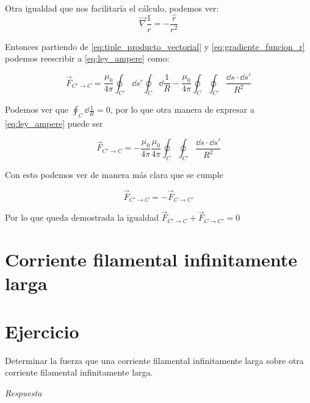 \documentclass[11pt]{report}
\theoremstyle{plain}
\theoremstyle{definition}
\begin{document}
Otra igualdad que nos facilitaría el cálculo, podemos ver:
\begin{equation}
	\vec{\nabla}\frac{1}{r}=-\frac{\hat{r}}{r^2}
	\label{eq:gradiente_funcion_r}
\end{equation}

Entonces partiendo de \ref{eq:tiple_producto_vectorial} y \ref{eq:gradiente_funcion_r} podemos reescribir a \ref{eq:ley_ampere} como:

\begin{equation*}
	\vec{F}_{C' \rightarrow C} = \frac{\mu_0}{4\pi} \oint_{C'} \dd{s'} \oint_C \dd{\frac{1}{R}} - \frac{\mu_0}{4\pi}\oint_C \oint_{C'} \frac{\dd{s} \cdot \dd{s'}}{R^2}
\end{equation*}

Podemos ver que $\oint_C \dd{\frac{1}{R}} = 0$, por lo que otra manera de expresar a \ref{eq:ley_ampere} puede ser 


\begin{equation} %
	\vec{F}_{C' \rightarrow C} = - \frac{\mu_0}{4\pi} \frac{\mu_0}{4\pi}\oint_C \oint_{C'} \frac{\dd{s} \cdot \dd{s'}}{R^2}
	\label{eq:ley_ampere_no_cruz}
\end{equation}


Con esto podemos ver de manera más clara que se cumple

\begin{equation*} %
	\vec{F}_{C' \rightarrow C} = - \vec{F}_{C \rightarrow C'} 
\end{equation*}

Por lo que queda demostrada la igualdad $\vec{F}_{C' \rightarrow C} + \vec{F}_{C \rightarrow C'} = 0$\\



\section{Corriente filamental infinitamente larga}

\section*{Ejercicio}
Determinar la fuerza que una corriente filamental infinitamente larga sobre otra corriente filamental infinitamente larga.



\textit{Respuesta}\\
\end{document}
